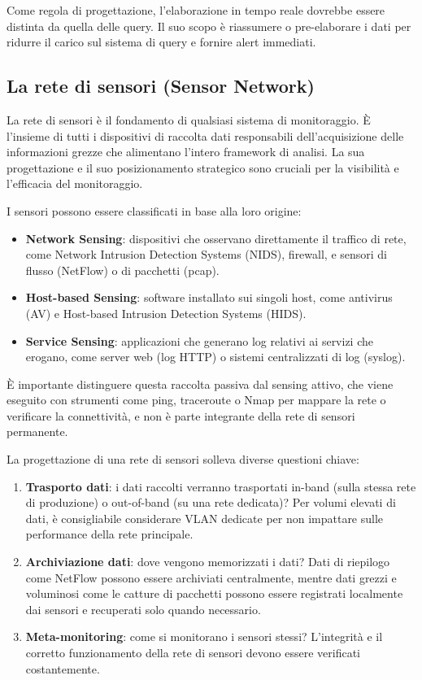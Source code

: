 Come regola di progettazione, l'elaborazione in tempo reale dovrebbe essere
distinta da quella delle query. Il suo scopo è riassumere o pre-elaborare i dati
per ridurre il carico sul sistema di query e fornire alert immediati.

\subsection{La rete di sensori (Sensor Network)}

La rete di sensori è il fondamento di qualsiasi sistema di monitoraggio.
È l'insieme di tutti i dispositivi di raccolta dati responsabili
dell'acquisizione delle informazioni grezze che alimentano l'intero
framework di analisi. La sua progettazione e il suo posizionamento
strategico sono cruciali per la visibilità e l'efficacia del monitoraggio.

I sensori possono essere classificati in base alla loro origine:

\begin{itemize}
\item \textbf{Network Sensing}: dispositivi che osservano direttamente
il traffico di rete, come Network Intrusion Detection Systems (NIDS),
firewall, e sensori di flusso (NetFlow) o di pacchetti (pcap).
\item \textbf{Host-based Sensing}: software installato sui singoli host,
come antivirus (AV) e Host-based Intrusion Detection Systems (HIDS).
\item \textbf{Service Sensing}: applicazioni che generano log relativi
ai servizi che erogano, come server web (log HTTP) o sistemi
centralizzati di log (syslog).
\end{itemize}

È importante distinguere questa raccolta passiva dal sensing attivo,
che viene eseguito con strumenti come ping, traceroute
o Nmap per mappare la rete o verificare la connettività,
e non è parte integrante della rete di sensori permanente.

La progettazione di una rete di sensori solleva diverse questioni chiave:

\begin{enumerate}
\item \textbf{Trasporto dati}: i dati raccolti verranno trasportati
in-band (sulla stessa rete di produzione) o out-of-band
(su una rete dedicata)? Per volumi elevati di dati, è consigliabile
considerare VLAN dedicate per non impattare sulle performance
della rete principale.
\item \textbf{Archiviazione dati}: dove vengono memorizzati i dati?
Dati di riepilogo come NetFlow possono essere archiviati centralmente,
mentre dati grezzi e voluminosi come le catture di pacchetti possono
essere registrati localmente dai sensori e recuperati solo quando necessario.
\item \textbf{Meta-monitoring}: come si monitorano i sensori stessi?
L'integrità e il corretto funzionamento della rete di sensori
devono essere verificati costantemente.
\end{enumerate}

